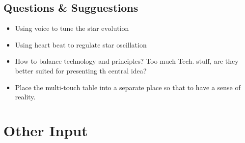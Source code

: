 \subsection{Questions \& Sugguestions}
\begin{itemize}
\item Using voice to tune the star evolution
\item Using heart beat to regulate star oscillation
\item How to balance technology and principles? Too much Tech. stuff, are they better suited for presenting th central idea?
\item Place the multi-touch table into a separate place so that to have a sense of reality. 
\end{itemize}

\section{Other Input}

